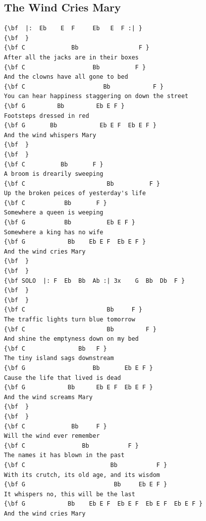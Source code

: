 \documentclass[a4paper]{article}
\begin{document}
\subsection{The Wind Cries Mary} %
\label{sub:The Wind Cries Mary}
\begin{Verbatim}[commandchars=\\\{\}]
{\bf  |:  Eb    E  F     Eb   E  F :| }
{\bf  }
{\bf C             Bb                 F }
After all the jacks are in their boxes 
{\bf C                   Bb          F }
And the clowns have all gone to bed 
{\bf C                      Bb            F }
You can hear happiness staggering on down the street 
{\bf G         Bb         Eb E F }
Footsteps dressed in red 
{\bf G       Bb            Eb E F  Eb E F }
And the wind whispers Mary 
{\bf  }
{\bf  }
{\bf C          Bb       F }
A broom is drearily sweeping 
{\bf C                       Bb          F }
Up the broken peices of yesterday's life 
{\bf C           Bb       F }
Somewhere a queen is weeping 
{\bf G           Bb          Eb E F }
Somewhere a king has no wife 
{\bf G            Bb    Eb E F  Eb E F }
And the wind cries Mary 
{\bf  }
{\bf  }
{\bf SOLO  |: F  Eb  Bb  Ab :| 3x    G  Bb  Db  F }
{\bf  }
{\bf  }
{\bf C                       Bb     F }
The traffic lights turn blue tomorrow 
{\bf C                       Bb         F }
And shine the emptyness down on my bed 
{\bf C               Bb   F }
The tiny island sags downstream 
{\bf G                   Bb       Eb E F }
Cause the life that lived is dead 
{\bf G            Bb      Eb E F  Eb E F }
And the wind screams Mary 
{\bf  }
{\bf  }
{\bf C             Bb     F }
Will the wind ever remember 
{\bf C                Bb           F }
The names it has blown in the past 
{\bf C                        Bb           F }
With its crutch, its old age, and its wisdom 
{\bf G                         Bb     Eb E F }
It whispers no, this will be the last 
{\bf G            Bb    Eb E F  Eb E F  Eb E F  Eb E F }
And the wind cries Mary 
\end{Verbatim}
\newpage
\end{document}
